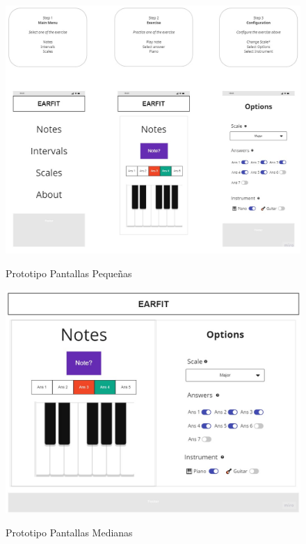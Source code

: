 \documentclass[12pt,twoside,titlepage]{report}
\begin{document}
    \begin{figure}[H]
        \centering
        \includegraphics[scale=0.33]{Design Thinking/Prototipo/Small/Prototipo}
        \label{fig:PrototipoSmall}
        \caption{Prototipo Pantallas Pequeñas}
    \end{figure}

    \begin{figure}[H]
        \centering
        \includegraphics[scale=0.3]{Design Thinking/Prototipo/Medium/Notes}
        \label{fig:PrototipoMedium}
        \caption{Prototipo Pantallas Medianas}
    \end{figure}
    
\end{document}
